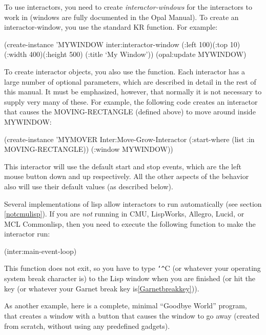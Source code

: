 To use interactors, you need to create {\it interactor-windows} for the
interactors to work in (windows are fully documented in the Opal Manual).
To create an interactor-window, you use the standard KR
 function.  For example:
\begin{programexample}
(create-instance 'MYWINDOW inter:interactor-window
   (:left 100)(:top 10)
   (:width 400)(:height 500)
   (:title `My Window'))
(opal:update MYWINDOW)
\end{programexample}

To create interactor objects, you also use the 
function.  Each interactor has a large number of optional parameters, which are
described in detail in the rest of this manual.  It must be emphasized,
however, that normally it is not necessary to supply very many of these.
For example, the following code creates an interactor that causes the
MOVING-RECTANGLE (defined above) to move around inside MYWINDOW:
\begin{programexample}
(create-instance 'MYMOVER Inter:Move-Grow-Interactor
   (:start-where (list :in MOVING-RECTANGLE))
   (:window MYWINDOW))
\end{programexample}

This interactor will use the default start and stop events, which are the
left mouse button down and up respectively.  All the other aspects of the
behavior also will use their default values (as described below).

Several implementations of lisp allow interactors to run automatically
(see section \ref{notcmulisp}).  If you are {\it not} running in CMU,
LispWorks, Allegro, Lucid, or MCL Commonlisp, then you need to execute the
following function to make the interactor run:
\begin{programexample}
(inter:main-event-loop)
\end{programexample}
This function does not exit, so you have to type {\tt\char`\^}C (or whatever your
operating system break character is) to the Lisp window when you are
finished (or hit the  key (or whatever your Garnet break key
is\dashsection \ref{Garnetbreakkey})).

As another example, here is a complete, minimal ``Goodbye World'' program, that
creates a window with a button that causes the window to go away (created
from scratch, without using any predefined gadgets).

